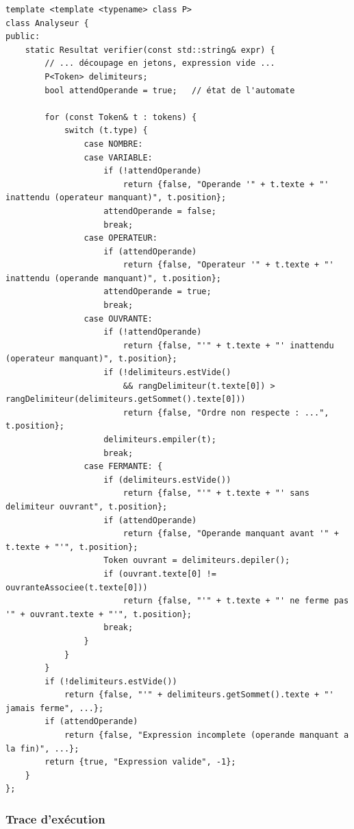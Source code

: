 \documentclass[11pt,a4paper]{article}
\newcommand{\code}[1]{\texttt{#1}}
\begin{document}
\begin{lstlisting}[caption={C\oe{}ur de la méthode \code{verifier}}]
template <template <typename> class P>
class Analyseur {
public:
    static Resultat verifier(const std::string& expr) {
        // ... découpage en jetons, expression vide ...
        P<Token> delimiteurs;
        bool attendOperande = true;   // état de l'automate

        for (const Token& t : tokens) {
            switch (t.type) {
                case NOMBRE:
                case VARIABLE:
                    if (!attendOperande)
                        return {false, "Operande '" + t.texte + "' inattendu (operateur manquant)", t.position};
                    attendOperande = false;
                    break;
                case OPERATEUR:
                    if (attendOperande)
                        return {false, "Operateur '" + t.texte + "' inattendu (operande manquant)", t.position};
                    attendOperande = true;
                    break;
                case OUVRANTE:
                    if (!attendOperande)
                        return {false, "'" + t.texte + "' inattendu (operateur manquant)", t.position};
                    if (!delimiteurs.estVide()
                        && rangDelimiteur(t.texte[0]) > rangDelimiteur(delimiteurs.getSommet().texte[0]))
                        return {false, "Ordre non respecte : ...", t.position};
                    delimiteurs.empiler(t);
                    break;
                case FERMANTE: {
                    if (delimiteurs.estVide())
                        return {false, "'" + t.texte + "' sans delimiteur ouvrant", t.position};
                    if (attendOperande)
                        return {false, "Operande manquant avant '" + t.texte + "'", t.position};
                    Token ouvrant = delimiteurs.depiler();
                    if (ouvrant.texte[0] != ouvranteAssociee(t.texte[0]))
                        return {false, "'" + t.texte + "' ne ferme pas '" + ouvrant.texte + "'", t.position};
                    break;
                }
            }
        }
        if (!delimiteurs.estVide())
            return {false, "'" + delimiteurs.getSommet().texte + "' jamais ferme", ...};
        if (attendOperande)
            return {false, "Expression incomplete (operande manquant a la fin)", ...};
        return {true, "Expression valide", -1};
    }
};
\end{lstlisting}

\subsubsection{Trace d'exécution}
\end{document}
